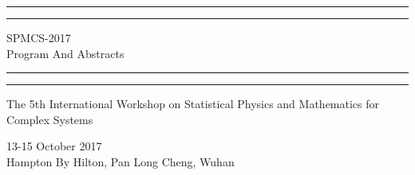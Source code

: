 \documentclass[oneside,A4paper,12pt]{article}
\begin{document}
\begin{titlepage} %

	\centering %
	
	\scshape %
	
	\vspace*{\baselineskip} %
	
	
	\rule{\textwidth}{1.6pt}\vspace*{-\baselineskip}\vspace*{2pt} %
	\rule{\textwidth}{0.4pt} %
	
	\vspace{0.75\baselineskip} %
	
	{\LARGE SPMCS-2017 \\ Program And Abstracts\\} %
	
	\vspace{0.75\baselineskip} %
	
	\rule{\textwidth}{0.4pt}\vspace*{-\baselineskip}\vspace{3.2pt} %
	\rule{\textwidth}{1.6pt} %
	
	\vspace{2\baselineskip} %
	
	
	The 5th International Workshop on Statistical Physics and Mathematics for Complex Systems %
	
	\vspace*{3\baselineskip} %
	
	
	
	\vspace{0.5\baselineskip} %
	
        13-15 October 2017 \\  Hampton By Hilton, Pan Long Cheng, Wuhan
	

\end{titlepage}
\end{document}
